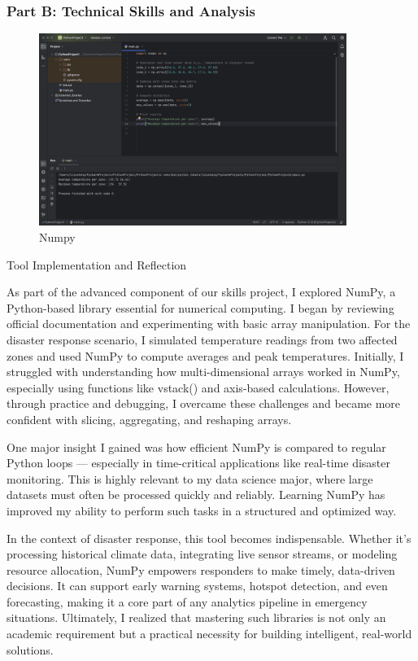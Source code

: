 \documentclass[a4paper, 11pt]{report}
\begin{document}
\subsubsection{Part B: Technical Skills and Analysis}

\begin{figure}[htbp]
\centering
\begin{minipage}[t]{1.5\textwidth}
\centering
\includegraphics[width=10cm]{Numpy.png}
\caption{Numpy}
\end{minipage}
\end{figure}


Tool Implementation and Reflection

As part of the advanced component of our skills project, I explored NumPy, a Python-based library essential for numerical computing. I began by reviewing official documentation and experimenting with basic array manipulation. For the disaster response scenario, I simulated temperature readings from two affected zones and used NumPy to compute averages and peak temperatures. Initially, I struggled with understanding how multi-dimensional arrays worked in NumPy, especially using functions like vstack() and axis-based calculations. However, through practice and debugging, I overcame these challenges and became more confident with slicing, aggregating, and reshaping arrays.

One major insight I gained was how efficient NumPy is compared to regular Python loops — especially in time-critical applications like real-time disaster monitoring. This is highly relevant to my data science major, where large datasets must often be processed quickly and reliably. Learning NumPy has improved my ability to perform such tasks in a structured and optimized way.

In the context of disaster response, this tool becomes indispensable. Whether it's processing historical climate data, integrating live sensor streams, or modeling resource allocation, NumPy empowers responders to make timely, data-driven decisions. It can support early warning systems, hotspot detection, and even forecasting, making it a core part of any analytics pipeline in emergency situations. Ultimately, I realized that mastering such libraries is not only an academic requirement but a practical necessity for building intelligent, real-world solutions.
\end{document}
